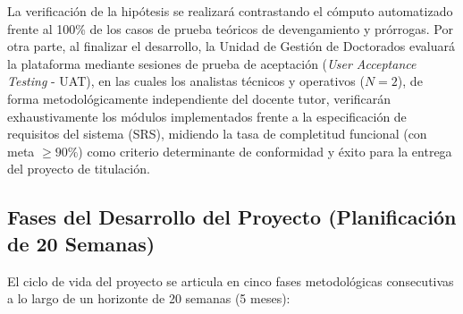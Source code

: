 La verificación de la hipótesis se realizará contrastando el cómputo automatizado frente al 100\% de los casos de prueba teóricos de devengamiento y prórrogas. Por otra parte, al finalizar el desarrollo, la Unidad de Gestión de Doctorados evaluará la plataforma mediante sesiones de prueba de aceptación (\textit{User Acceptance Testing} - UAT), en las cuales los analistas técnicos y operativos ($N = 2$), de forma metodológicamente independiente del docente tutor, verificarán exhaustivamente los módulos implementados frente a la especificación de requisitos del sistema (SRS), midiendo la tasa de completitud funcional (con meta $\ge 90\%$) como criterio determinante de conformidad y éxito para la entrega del proyecto de titulación.

\subsection{Fases del Desarrollo del Proyecto (Planificación de 20 Semanas)}

El ciclo de vida del proyecto se articula en cinco fases metodológicas consecutivas a lo largo de un horizonte de 20 semanas (5 meses):

